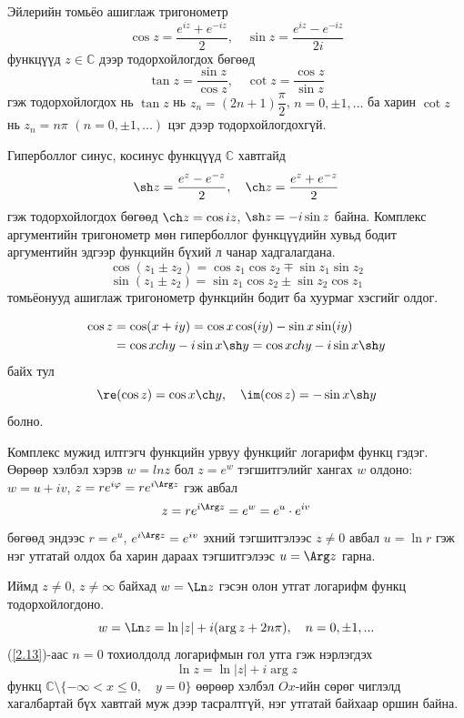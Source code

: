 Эйлерийн томьёо ашиглаж тригонометр
\begin{equation}
\cos z=\dfrac{e^{iz}+e^{-iz}}{2}, \quad \sin z= \dfrac{e^{iz}-e^{-iz}}{2i}
\end{equation}
функцүүд $z\in\mathbb{C}$ дээр тодорхойлогдох бөгөөд
\begin{equation}
\tan z=\dfrac{\sin z}{\cos z}, \quad \cot z= \dfrac{\cos z}{\sin z}
\end{equation}
гэж тодорхойлогдох нь $\tan z$ нь $z_n=(2n+1)\dfrac{\pi}{2}$, $n=0, \pm 1, ...$ ба харин $\cot z$ нь $z_n=n\pi $ $(n=0, \pm 1,...)$ цэг дээр тодорхойлогдохгүй.

Гиперболлог синус, косинус функцүүд  $\mathbb{C}$ хавтгайд
\begin{equation}
\sh z=\dfrac{e^z-e^{-z}}{2}, \quad \ch z= \dfrac{e^z+e^{-z}}{2}
\end{equation}
гэж тодорхойлогдох бөгөөд $\ch z =\cos iz$, $\sh z=-i\sin z$ байна. Комплекс аргументийн тригонометр мөн гиперболлог функцүүдийн хувьд бодит аргументийн эдгээр функцийн бүхий л чанар хадгалагдана.
$$\cos (z_1\pm z_2)=\cos z_1\cos z_2 \mp \sin z_1 \sin z_2$$
$$\sin (z_1\pm z_2)=\sin z_1\cos z_2 \pm \sin z_2 \cos z_1$$
томьёонууд ашиглаж тригонометр функцийн бодит ба хуурмаг хэсгийг олдог.
\begin{exm}
\begin{align*}
    \cos z&=\cos(x+iy)=\cos x\cos (iy)-\sin x \sin (iy) \\
    &= \cos x ch y -i\sin x \sh y =\cos x ch y -i\sin x \sh y
\end{align*}
байх тул  $$ \re (\cos z)= \cos x \ch y, \quad \im (\cos z)=-\sin x \sh y$$ болно. 
\end{exm}
Комплекс мужид илтгэгч функцийн урвуу функцийг логарифм функц  гэдэг. Өөрөөр хэлбэл хэрэв $w= ln z$ бол $z=e^w$ тэгшитгэлийг хангах $w$ олдоно: $w=u+iv$, $z=re^{i\varphi}=re^{i \Arg  z}$
гэж авбал 
$$z=re^{i \Arg  z}= e^{w}=e^u\cdot e^{iv}$$
бөгөөд эндээс $r=e^u$, $e^{i \Arg  z}=e^{iv}$ эхний тэгшитгэлээс $z\neq 0$ авбал $u=\ln r$ гэж нэг утгатай олдох ба харин дараах тэгшитгэлээс $u=\Arg  z$ гарна.

Иймд $z\neq 0$, $z\neq \infty$ байхад $w=\Ln z$ гэсэн олон утгат логарифм функц тодорхойлогдоно.
\begin{equation} \label{2.13}
w=\Ln z= \ln |z|+i (\arg  z+2n \pi), \quad n=0, \pm 1, ...
\end{equation}
(\ref{2.13})-аас $n=0$ тохиолдолд логарифмын гол утга гэж нэрлэгдэх
\begin{equation}
\ln z= \ln |z|+i \arg  z
\end{equation}
функц $\mathbb{C} \setminus \{ -\infty < x \leq 0, \quad y=0 \}$ өөрөөр хэлбэл $Ox$-ийн сөрөг чиглэлд хагалбартай бүх хавтгай муж дээр тасралтгүй, нэг утгатай байхаар оршин байна.

